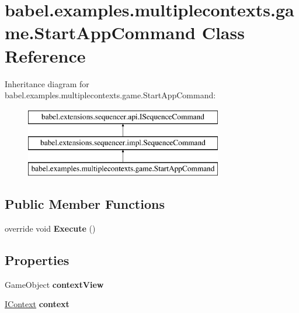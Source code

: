 \hypertarget{classbabel_1_1examples_1_1multiplecontexts_1_1game_1_1_start_app_command}{\section{babel.\-examples.\-multiplecontexts.\-game.\-Start\-App\-Command Class Reference}
\label{classbabel_1_1examples_1_1multiplecontexts_1_1game_1_1_start_app_command}
}
Inheritance diagram for babel.\-examples.\-multiplecontexts.\-game.\-Start\-App\-Command\-:\begin{figure}[H]
\begin{center}
\leavevmode
\includegraphics[height=3.000000cm]{classbabel_1_1examples_1_1multiplecontexts_1_1game_1_1_start_app_command}
\end{center}
\end{figure}
\subsection*{Public Member Functions}
\begin{DoxyCompactItemize}
\item 
\hypertarget{classbabel_1_1examples_1_1multiplecontexts_1_1game_1_1_start_app_command_a080414fda7e19b06f38b1c56964af19a}{override void {\bfseries Execute} ()}\label{classbabel_1_1examples_1_1multiplecontexts_1_1game_1_1_start_app_command_a080414fda7e19b06f38b1c56964af19a}

\end{DoxyCompactItemize}
\subsection*{Properties}
\begin{DoxyCompactItemize}
\item 
\hypertarget{classbabel_1_1examples_1_1multiplecontexts_1_1game_1_1_start_app_command_a761420bc413ff180b5f95bccc2e920f7}{Game\-Object {\bfseries context\-View}}\label{classbabel_1_1examples_1_1multiplecontexts_1_1game_1_1_start_app_command_a761420bc413ff180b5f95bccc2e920f7}

\item 
\hypertarget{classbabel_1_1examples_1_1multiplecontexts_1_1game_1_1_start_app_command_a282072ae1e238cac14c2dbe496225780}{\hyperlink{interfacebabel_1_1extensions_1_1context_1_1api_1_1_i_context}{I\-Context} {\bfseries context}}\label{classbabel_1_1examples_1_1multiplecontexts_1_1game_1_1_start_app_command_a282072ae1e238cac14c2dbe496225780}

\end{DoxyCompactItemize}



